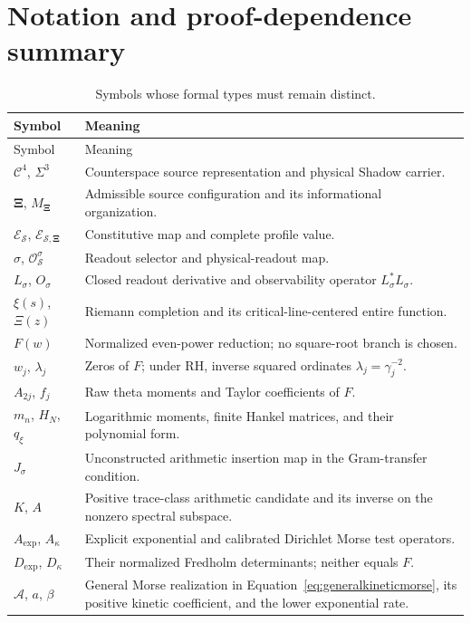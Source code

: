 \documentclass[11pt,letterpaper]{article}
\numberwithin{equation}{section}
\theoremstyle{definition}
\theoremstyle{remark}
\newcommand{\CS}{\mathcal C}
\newcommand{\ES}{\mathcal E_{\mathcal S}}
\newcommand{\src}{\boldsymbol\Xi}
\begin{document}
\section{Notation and proof-dependence summary}
\label{app:notation}
\begin{longtable}{P{0.25\textwidth}P{0.68\textwidth}}
\caption{Symbols whose formal types must remain distinct.}\\
\toprule
Symbol & Meaning\\
\midrule
\endfirsthead
\toprule
Symbol & Meaning\\
\midrule
\endhead
$\CS^4$, $\Sigma^3$ & Counterspace source representation and physical Shadow carrier.\\
$\src$, $M_{\src}$ & Admissible source configuration and its informational organization.\\
$\ES$, $\mathcal E_{\mathcal S,\src}$ & Constitutive map and complete profile value.\\
$\sigma$, $\mathcal O^\sigma_{\mathcal S}$ & Readout selector and physical-readout map.\\
$L_\sigma$, $O_\sigma$ & Closed readout derivative and observability operator $L_\sigma^*L_\sigma$.\\
$\xi(s)$, $\Xi(z)$ & Riemann completion and its critical-line-centered entire function.\\
$F(w)$ & Normalized even-power reduction; no square-root branch is chosen.\\
$w_j$, $\lambda_j$ & Zeros of $F$; under RH, inverse squared ordinates $\lambda_j=\gamma_j^{-2}$.\\
$A_{2j}$, $f_j$ & Raw theta moments and Taylor coefficients of $F$.\\
$m_n$, $H_N$, $q_\xi$ & Logarithmic moments, finite Hankel matrices, and their polynomial form.\\
$J_\sigma$ & Unconstructed arithmetic insertion map in the Gram-transfer condition.\\
$K$, $A$ & Positive trace-class arithmetic candidate and its inverse on the nonzero spectral subspace.\\
$A_{\mathrm{exp}}$, $A_\kappa$ & Explicit exponential and calibrated Dirichlet Morse test operators.\\
$D_{\mathrm{exp}}$, $D_\kappa$ & Their normalized Fredholm determinants; neither equals $F$.\\
$\mathcal A$, $a$, $\beta$ & General Morse realization in Equation~\eqref{eq:generalkineticmorse}, its positive kinetic coefficient, and the lower exponential rate.\\

\end{longtable}
\end{document}
